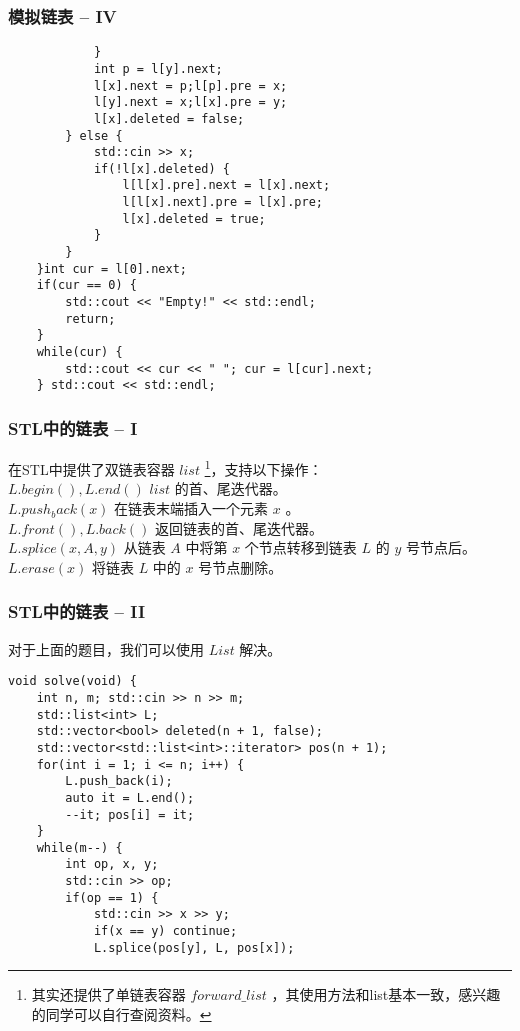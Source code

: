 \documentclass{beamer}
\begin{document}
\begin{frame}[fragile]
\frametitle{模拟链表 -- IV}
\begin{onlyenv}
\begin{verbatim}
            }
            int p = l[y].next;
            l[x].next = p;l[p].pre = x;
            l[y].next = x;l[x].pre = y;
            l[x].deleted = false;
        } else {
            std::cin >> x;
            if(!l[x].deleted) {
                l[l[x].pre].next = l[x].next;
                l[l[x].next].pre = l[x].pre;
                l[x].deleted = true;
            }
        }
    }int cur = l[0].next;
    if(cur == 0) {
        std::cout << "Empty!" << std::endl;
        return;
    }
    while(cur) {
        std::cout << cur << " "; cur = l[cur].next;
    } std::cout << std::endl;
\end{verbatim}
\end{onlyenv}
\end{frame}
\begin{frame}
\frametitle{STL中的链表 -- I}
在STL中提供了双链表容器 $list$ \footnote{其实还提供了单链表容器 $forward\_list$ ，其使用方法和list基本一致，感兴趣的同学可以自行查阅资料。}，支持以下操作：\\ 
$L.begin(), L.end()$ $list$ 的首、尾迭代器。 \\ 
$L.push_back(x)$ 在链表末端插入一个元素 $x$ 。\\ 
$L.front(), L.back()$ 返回链表的首、尾迭代器。 \\ 
$L.splice(x, A, y)$ 从链表 $A$ 中将第 $x$ 个节点转移到链表 $L$ 的 $y$ 号节点后。
$L.erase(x)$ 将链表 $L$ 中的 $x$ 号节点删除。
\end{frame}
\begin{frame}[fragile]
\frametitle{STL中的链表 -- II}
对于上面的题目，我们可以使用 $List$ 解决。
\begin{onlyenv}
\begin{verbatim}
void solve(void) {
    int n, m; std::cin >> n >> m;
    std::list<int> L;
    std::vector<bool> deleted(n + 1, false);
    std::vector<std::list<int>::iterator> pos(n + 1);
    for(int i = 1; i <= n; i++) {
        L.push_back(i);
        auto it = L.end();
        --it; pos[i] = it;
    }
    while(m--) {
        int op, x, y;
        std::cin >> op;
        if(op == 1) {
            std::cin >> x >> y;
            if(x == y) continue;
            L.splice(pos[y], L, pos[x]);
\end{verbatim}
\end{onlyenv}
\end{frame}
\end{document}
